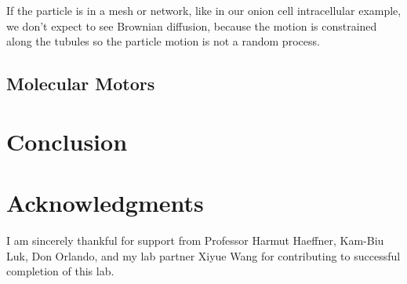 \documentclass[iop,revtex4]{emulateapj_mod}
\begin{document}
\par If the particle is in a mesh or network, like in our onion cell intracellular example, we don't expect to see Brownian diffusion, because the motion is constrained along the tubules so the particle motion is not a random process.
\subsection{Molecular Motors}
\section{Conclusion}\label{sec:conclusion}
 
\acknowledgments
\section*{Acknowledgments}
I am sincerely thankful for support from Professor Harmut Haeffner, Kam-Biu Luk, Don Orlando, and my lab partner Xiyue Wang for contributing to successful completion of this lab.

\end{document}
